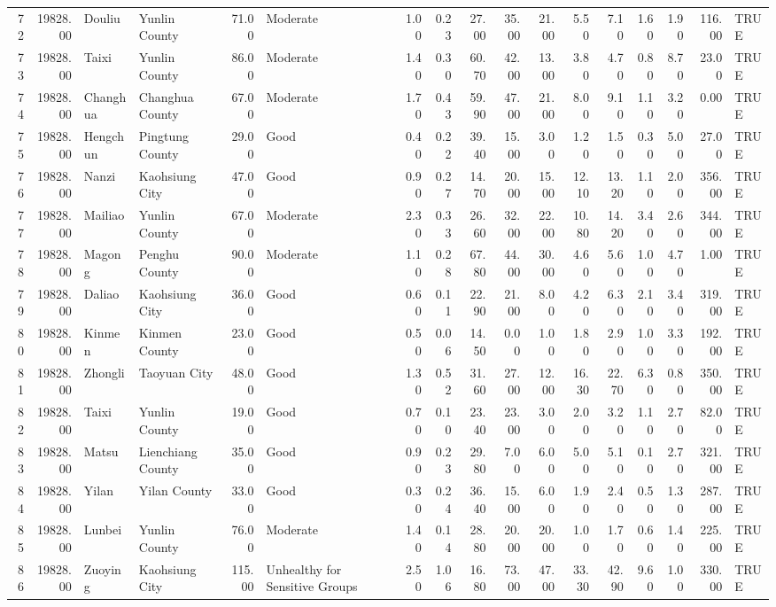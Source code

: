 \begin{table}[ht]
\begin{tabular}{rrllrlrrrrrrrrrrl}
  72 & 19828.00 & Douliu & Yunlin County & 71.00 & Moderate & 1.00 & 0.23 & 27.00 & 35.00 & 21.00 & 5.50 & 7.10 & 1.60 & 1.90 & 116.00 & TRUE \\ 
  73 & 19828.00 & Taixi & Yunlin County & 86.00 & Moderate & 1.40 & 0.30 & 60.70 & 42.00 & 13.00 & 3.80 & 4.70 & 0.80 & 8.70 & 23.00 & TRUE \\ 
  74 & 19828.00 & Changhua & Changhua County & 67.00 & Moderate & 1.70 & 0.43 & 59.90 & 47.00 & 21.00 & 8.00 & 9.10 & 1.10 & 3.20 & 0.00 & TRUE \\ 
  75 & 19828.00 & Hengchun & Pingtung County & 29.00 & Good & 0.40 & 0.22 & 39.40 & 15.00 & 3.00 & 1.20 & 1.50 & 0.30 & 5.00 & 27.00 & TRUE \\ 
  76 & 19828.00 & Nanzi & Kaohsiung City & 47.00 & Good & 0.90 & 0.27 & 14.70 & 20.00 & 15.00 & 12.10 & 13.20 & 1.10 & 2.00 & 356.00 & TRUE \\ 
  77 & 19828.00 & Mailiao & Yunlin County & 67.00 & Moderate & 2.30 & 0.33 & 26.60 & 32.00 & 22.00 & 10.80 & 14.20 & 3.40 & 2.60 & 344.00 & TRUE \\ 
  78 & 19828.00 & Magong & Penghu County & 90.00 & Moderate & 1.10 & 0.28 & 67.80 & 44.00 & 30.00 & 4.60 & 5.60 & 1.00 & 4.70 & 1.00 & TRUE \\ 
  79 & 19828.00 & Daliao & Kaohsiung City & 36.00 & Good & 0.60 & 0.11 & 22.90 & 21.00 & 8.00 & 4.20 & 6.30 & 2.10 & 3.40 & 319.00 & TRUE \\ 
  80 & 19828.00 & Kinmen & Kinmen County & 23.00 & Good & 0.50 & 0.06 & 14.50 & 0.00 & 1.00 & 1.80 & 2.90 & 1.00 & 3.30 & 192.00 & TRUE \\ 
  81 & 19828.00 & Zhongli & Taoyuan City & 48.00 & Good & 1.30 & 0.52 & 31.60 & 27.00 & 12.00 & 16.30 & 22.70 & 6.30 & 0.80 & 350.00 & TRUE \\ 
  82 & 19828.00 & Taixi & Yunlin County & 19.00 & Good & 0.70 & 0.10 & 23.40 & 23.00 & 3.00 & 2.00 & 3.20 & 1.10 & 2.70 & 82.00 & TRUE \\ 
  83 & 19828.00 & Matsu & Lienchiang County & 35.00 & Good & 0.90 & 0.23 & 29.80 & 7.00 & 6.00 & 5.00 & 5.10 & 0.10 & 2.70 & 321.00 & TRUE \\ 
  84 & 19828.00 & Yilan & Yilan County & 33.00 & Good & 0.30 & 0.24 & 36.40 & 15.00 & 6.00 & 1.90 & 2.40 & 0.50 & 1.30 & 287.00 & TRUE \\ 
  85 & 19828.00 & Lunbei & Yunlin County & 76.00 & Moderate & 1.40 & 0.14 & 28.80 & 20.00 & 20.00 & 1.00 & 1.70 & 0.60 & 1.40 & 225.00 & TRUE \\ 
  86 & 19828.00 & Zuoying & Kaohsiung City & 115.00 & Unhealthy for Sensitive Groups & 2.50 & 1.06 & 16.80 & 73.00 & 47.00 & 33.30 & 42.90 & 9.60 & 1.00 & 330.00 & TRUE \\ 

\end{tabular}
\end{table}
